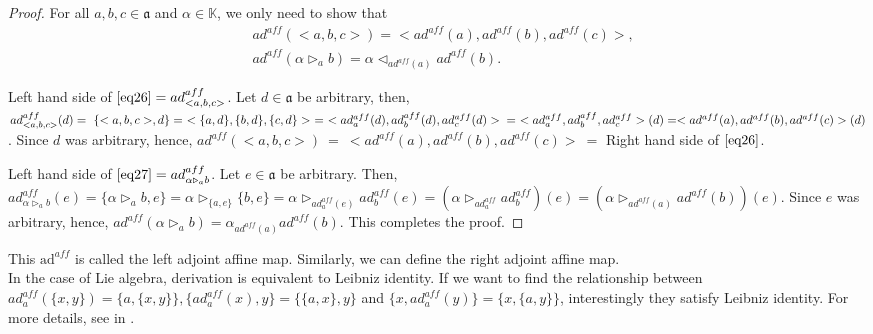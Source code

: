 \documentclass{article}
\theoremstyle{definition}
\theoremstyle{remark}
\theoremstyle{plain}
\begin{document}
\begin{proof}
For all $a, b, c \in \mathfrak{a}$ and $\alpha \in \mathbb{K}$, we only need to show that 
\begin{align}
  &ad^{aff}(<a, b, c>)=<ad^{aff}(a), ad^{aff}(b), ad^{aff}(c)>, \label{eq26} \\ 
 &ad^{aff}(\alpha \triangleright_{a}b)=\alpha \triangleleft_{ad^{aff}(a)}ad^{aff}(b).\label{eq27}
\end{align}

Left hand side of $\ref{eq26}=ad^{aff}_{<a, b, c>}$. Let $d \in \mathfrak{a}$ be arbitrary, then, 
$ad^{aff}_{<a, b, c>}(d)=~\{<a, b, c>, d\}=~<\{a, d\}, \{b, d\}, \{c, d\}>~ =~<ad^{aff}_{a}(d),ad^{aff}_{b}(d),ad^{aff}_{c}(d)>\\=~<ad^{aff}_{a}, ad^{aff}_{b}, ad^{aff}_{c}>(d)=<ad^{aff}(a), ad^{aff}(b), ad^{aff}(c)>(d)$. Since $d$ was arbitrary, hence, $ad^{aff}(<a, b, c>)~=~<ad^{aff}(a), ad^{aff}(b), ad^{aff}(c)>~=$ Right hand side of $\ref{eq26}$.

Left hand side of $\ref{eq27}=ad^{aff}_{\alpha \triangleright_{a}b}$. Let $e\in \mathfrak{a}$ be arbitrary. Then, $ad^{aff}_{\alpha \triangleright_{a}b}(e)=\{\alpha \triangleright_{a}b, e\}=\alpha \triangleright_{\{a, e\}}\{b, e\}= \alpha \triangleright_{ad^{aff}_{a}(e)}ad^{aff}_{b}(e)=(\alpha \triangleright_{ad^{aff}_{a}}ad^{aff}_{b})(e)=(\alpha \triangleright_{ad^{aff}(a)}ad^{aff}(b))(e)$. Since $e$ was arbitrary, hence, $ad^{aff}(\alpha \triangleright_{a}b)=\alpha_{ad^{aff}(a)}ad^{aff}(b)$. This completes the proof. \end{proof}
This $\text{ad}^{aff}$ is called the left adjoint affine map. Similarly, we can define the right adjoint affine map.\\
In the case of Lie algebra, derivation is equivalent to Leibniz identity. If we want to find the relationship between $ad^{aff}_{a}(\{x, y\})=\{a, \{x, y\}\}, \{ad^{aff}_{a}(x), y\}=\{\{a, x\}, y\}$ and $\{x, ad^{aff}_{a}(y)\}=\{x, \{a, y\}\}$, interestingly they satisfy Leibniz identity. For more details, see in \cite{Brz26}.

\end{document}
